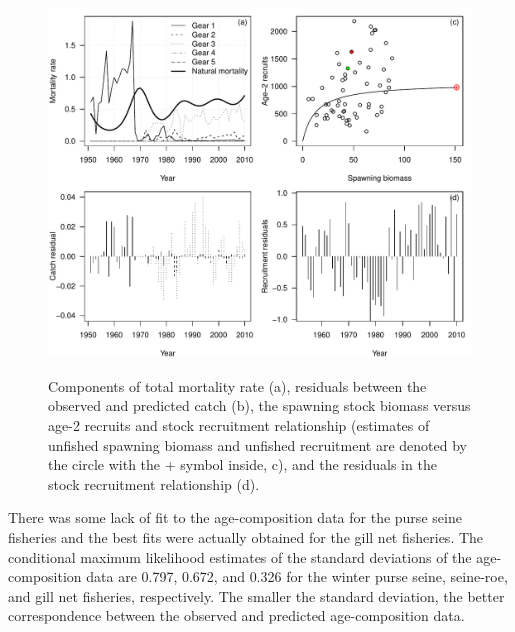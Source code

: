 \begin{figure}[!tbp]
	\includegraphics[width=\textwidth]{../Figs/fig2_HCAM_ctrl.pdf}\\
	\caption{Components of total mortality rate (a), residuals between the observed and predicted catch (b), the spawning stock biomass versus age-2 recruits and stock recruitment relationship (estimates of unfished spawning biomass and unfished recruitment are denoted by the circle with the + symbol inside, c), and the residuals in the stock recruitment relationship (d). }\label{fig2_HCAM_ctrl}
\end{figure}

There was some lack of fit to the age-composition data for the purse seine fisheries and the best fits were actually obtained for the gill net fisheries. The conditional maximum likelihood estimates of the standard deviations of the age-composition data are 0.797, 0.672, and 0.326 for the winter purse seine, seine-roe, and gill net fisheries, respectively.  The smaller the standard deviation, the better correspondence between the observed and predicted age-composition data.

